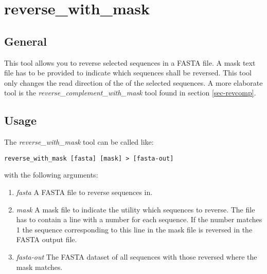 \section{reverse\_with\_mask}

\subsection{General}

This tool allows you to reverse selected sequences in a FASTA file. A
mask text file has to be provided to indicate which sequences shall
be reversed. This tool only changes the read direction of the of the
selected sequences. A more elaborate tool is the
\emph{reverse\_complement\_with\_mask} tool found in section \ref{sec-revcomp}.

\subsection{Usage}

The \emph{reverse\_with\_mask} tool can be called like:
\begin{lstlisting}
reverse_with_mask [fasta] [mask] > [fasta-out]
\end{lstlisting}
with the following arguments:
\begin{enumerate}
  \item \emph{fasta} A FASTA file to reverse sequences in.
  \item \emph{mask} A mask file to indicate the utility which sequences to
    reverse. The file has to contain a line with a number for each
    sequence. If the number matches 1 the sequence corresponding to
    this line in the mask file is reversed in the FASTA output file.
  \item \emph{fasta-out} The FASTA dataset of all sequences
    with those reversed where the mask matches.
\end{enumerate}

